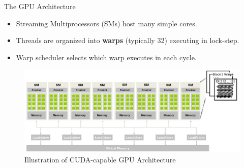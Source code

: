 \documentclass{beamer}
\begin{document}
\begin{frame}{The GPU Architecture}
\begin{itemize}
  \item Streaming Multiprocessors (SMs) host many simple cores.
  \item Threads are organized into \textbf{warps} (typically 32) executing in lock-step.
  \item Warp scheduler selects which warp executes in each cycle.
\end{itemize}

\begin{figure}[t]
\centering
\includegraphics[scale=0.35]{gpuArch.png}
\caption{Illustration of CUDA-capable GPU Architecture}
\label{fig:gpuArch}
\end{figure}    
\end{frame}
\end{document}
